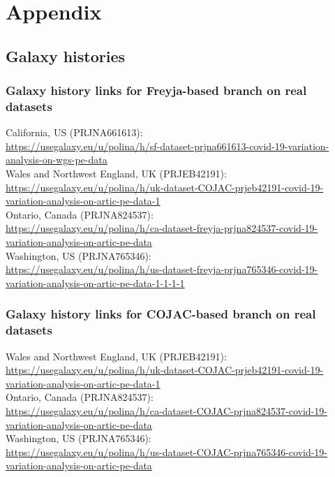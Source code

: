 %
\section{Appendix} \label{sec:appendix}
    \subsection{Galaxy histories} \label{sec:appendix:galaxy-hist}
    \subsubsection{Galaxy history links for Freyja-based branch on real datasets}
    California, US (PRJNA661613): \\
    \small{\url{https://usegalaxy.eu/u/polina/h/sf-dataset-prjna661613-covid-19-variation-analysis-on-wgs-pe-data}}\\
    Wales and Northwest England, UK (PRJEB42191): \\
    \small{\url{https://usegalaxy.eu/u/polina/h/uk-dataset-COJAC-prjeb42191-covid-19-variation-analysis-on-artic-pe-data-1}}\\
    Ontario, Canada (PRJNA824537): \\
    \small{\url{https://usegalaxy.eu/u/polina/h/ca-dataset-freyja-prjna824537-covid-19-variation-analysis-on-artic-pe-data}}\\
    Washington, US (PRJNA765346): \\
    \small{\url{https://usegalaxy.eu/u/polina/h/us-dataset-freyja-prjna765346-covid-19-variation-analysis-on-artic-pe-data-1-1-1-1}}

    \subsubsection{Galaxy history links for COJAC-based branch on real datasets}
    Wales and Northwest England, UK (PRJEB42191): \\
    \small{\url{https://usegalaxy.eu/u/polina/h/uk-dataset-COJAC-prjeb42191-covid-19-variation-analysis-on-artic-pe-data-1}}\\
    Ontario, Canada (PRJNA824537): \\
    \small{\url{https://usegalaxy.eu/u/polina/h/ca-dataset-COJAC-prjna824537-covid-19-variation-analysis-on-artic-pe-data}}\\
    Washington, US (PRJNA765346): \\
    \small{\url{https://usegalaxy.eu/u/polina/h/us-dataset-COJAC-prjna765346-covid-19-variation-analysis-on-artic-pe-data}}
    
